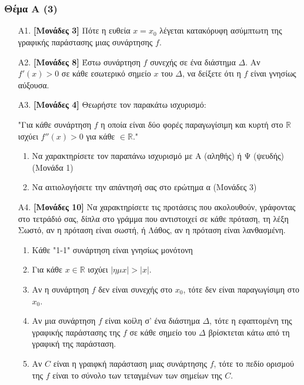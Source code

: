 \documentclass[14pt]{extarticle}
\begin{document}
\part*{}

\section*{Θέμα Α (3)}
\begin{enumerate}
 \item[Α1.] \textbf{[Μονάδες 3]} Πότε η ευθεία $x=x_0$ λέγεται κατακόρυφη ασύμπτωτη της γραφικής παράστασης μιας συνάρτησης $f$.
 \item[Α2.] \textbf{[Μονάδες 8]} Έστω συνάρτηση $f$ συνεχής σε ένα διάστημα $Δ$. Αν $f'(x)>0$ σε κάθε εσωτερικό σημείο $x$ του $Δ$, να δείξετε ότι η $f$ είναι γνησίως αύξουσα.
 \item[A3.] \textbf{[Μονάδες 4]} Θεωρήστε τον παρακάτω ισχυρισμό:
       
       "Για κάθε συνάρτηση $f$ η οποία είναι δύο φορές παραγωγίσιμη και κυρτή στο $\mathbb{R}$ ισχύει $f''(x)>0$ για κάθε $\in\mathbb{R}$."
       \begin{enumerate}
        \item Να χαρακτηρίσετε τον παραπάνω ισχυρισμό με Α (αληθής) ή Ψ (ψευδής) (Μονάδα 1)
        \item Να αιτιολογήσετε την απάντησή σας στο ερώτημα α (Μονάδες 3)
       \end{enumerate}
       
 \item[A4.] \textbf{[Μονάδες 10]} Να χαρακτηρίσετε τις προτάσεις που ακολουθούν, γράφοντας στο τετράδιό σας, δίπλα στο γράμμα που αντιστοιχεί σε κάθε πρόταση, τη λέξη Σωστό, αν η πρόταση είναι σωστή, ή Λάθος, αν η πρόταση είναι λανθασμένη.
       \begin{enumerate}
        \item Κάθε "1-1" συνάρτηση είναι γνησίως μονότονη
        \item Για κάθε $x\in\mathbb{R}$ ισχύει $|ημx|>|x|$.
        \item Αν η συνάρτηση $f$ δεν είναι συνεχής στο $x_0$, τότε δεν είναι παραγωγίσιμη στο $x_0$.
        \item Αν μια συνάρτηση $f$ είναι κοίλη σ' ένα διάστημα $Δ$, τότε η εφαπτομένη της γραφικής παράστασης της $f$ σε κάθε σημείο του $Δ$ βρίσκτεται κάτω από τη γραφική της παράσταση.
        \item Αν $C$ είναι η γραιφκή παράσταση μιας συνάρτησης $f$, τότε το πεδίο ορισμού της $f$ είναι το σύνολο των τεταγμένων των σημείων της $C$.
       \end{enumerate}
\end{enumerate}
\end{document}
